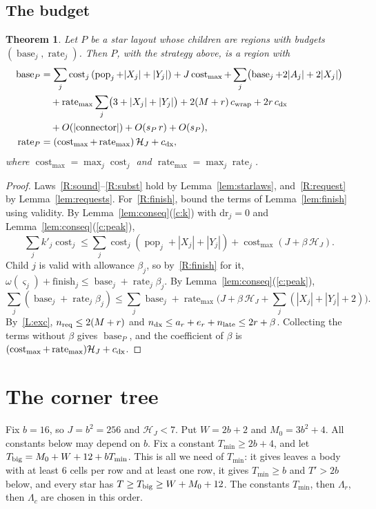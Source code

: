 \documentclass[11pt]{amsart}
\newtheorem{theorem}{Theorem}[section]
\theoremstyle{definition}
\newcommand{\pop}{\operatorname{pop}}
\newcommand{\base}{\operatorname{base}}
\newcommand{\rate}{\operatorname{rate}}
\newcommand{\cost}{\operatorname{cost}}
\begin{document}
\subsection{The budget}

\begin{theorem}\label{thm:star}
Let $P$ be a star layout whose children are regions with budgets $(\base_j,\rate_j)$. Then $P$, with
the strategy above, is a region with
\begin{align*}
\base_P&=\sum_j\cost_j\,(\pop_j+|X_j|+|Y_j|)+J\cost_{\max}+\sum_j\bigl(\base_j+2|A_j|+2|X_j|\bigr)\\
&\quad+\rate_{\max}\sum_j\bigl(3+|X_j|+|Y_j|\bigr)+2(M+r)\,c_{\rm wrap}+2r\,c_{\rm dx}\\
&\quad+O(|\text{connector}|)+O(s_P\,r)+O(s_P),\\
\rate_P&=(\cost_{\max}+\rate_{\max})\,\mathcal H_J+c_{\rm dx},
\end{align*}
where $\cost_{\max}=\max_j\cost_j$ and $\rate_{\max}=\max_j\rate_j$.
\end{theorem}

\begin{proof}
Laws~\ref{R:sound}--\ref{R:subst} hold by Lemma~\ref{lem:starlaws}, and~\ref{R:request} by Lemma~\ref{lem:requests}. For~\ref{R:finish},
bound the terms of Lemma~\ref{lem:finish} using validity. By Lemma~\ref{lem:conseq}(\ref{c:k}) with $\mathrm{dr}_j=0$ and Lemma~\ref{lem:conseq}(\ref{c:peak}),
\[
\textstyle\sum_jk'_j\cost_j\le\sum_j\cost_j(\pop_j+|X_j|+|Y_j|)+\cost_{\max}(J+\beta\,\mathcal H_J).
\]
Child $j$ is valid with allowance $\beta_j$, so by~\ref{R:finish} for it, $\omega(\varsigma_j)+\text{finish}_j\le\base_j+\rate_j\beta_j$. By
Lemma~\ref{lem:conseq}(\ref{c:peak}),
\[
\textstyle\sum_j(\base_j+\rate_j\beta_j)\le\sum_j\base_j+\rate_{\max}\bigl(J+\beta\,\mathcal H_J+\sum_j(|X_j|+|Y_j|+2)\bigr).
\]
By~\ref{L:exc}, $n_{\rm req}\le2(M+r)$ and $n_{\rm dx}\le a_r+e_r+n_{\rm late}\le2r+\beta$. Collecting the terms without $\beta$ gives $\base_P$, and
the coefficient of $\beta$ is $(\cost_{\max}+\rate_{\max})\mathcal H_J+c_{\rm dx}$.
\end{proof}

\section{The corner tree}\label{sec:tree}

Fix $b=16$, so $J=b^2=256$ and $\mathcal H_J<7$. Put $W=2b+2$ and $M_0=3b^2+4$. All constants below may depend on $b$.
Fix a constant $T_{\min}\ge2b+4$, and let $T_{\rm big}=M_0+W+12+bT_{\min}$. This is all we need of $T_{\min}$: it gives
leaves a body with at least $6$ cells per row and at least one row, it gives $T_{\min}\ge b$ and $T'>2b$ below, and every star has
$T\ge T_{\rm big}\ge W+M_0+12$. The constants $T_{\min}$, then $\Lambda_r$, then $\Lambda_c$ are chosen in this order.
\end{document}
